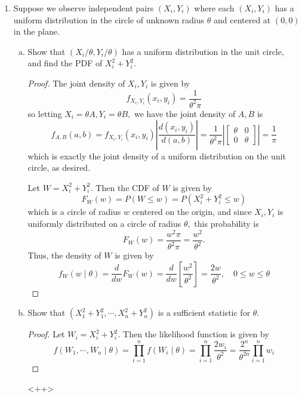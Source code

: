\documentclass{article}
\begin{document}
\begin{enumerate}
\begin{enumerate}[(a)]
		\end{enumerate}

	\item Suppose we observe independent pairs $(X_i, Y_i)$ where each $(X_i, Y_i)$ has a uniform distribution in the circle of unknown radius $\theta$ and centered at $(0, 0)$ in the plane.

		\begin{enumerate}[(a)]
			\item Show that $(X_i/\theta, Y_i/\theta)$ has a uniform distribution in the unit circle, and find the PDF of $X_i^2+Y_i^2.$
				\begin{proof}
					The joint density of $X_i, Y_i$ is given by \[f_{X_i, Y_i}(x_i, y_i)=\frac{1}{\theta^2\pi}\] so letting $X_i=\theta A, Y_i=\theta B,$ we have the joint density of $A, B$ is \[f_{A, B}(a, b)=f_{X_i, Y_i}(x_i, y_i)\left\lvert \frac{d(x_i, y_i)}{d(a, b)} \right\rvert = \frac{1}{\theta^2\pi} \left\lvert \begin{bmatrix}
						\theta & 0 \\ 0 & \theta
				\end{bmatrix}\right\rvert = \frac{1}{\pi}\] which is exactly the joint density of a uniform distribution on the unit circle, as desired.

				Let $W=X_i^2+Y_i^2.$ Then the CDF of $W$ is given by \[F_W(w)=P(W\le w)=P(X_i^2+Y_i^2\le w)\] which is a circle of radius $w$ centered on the origin, and since $X_i, Y_i$ is uniformly distributed on a circle of radius $\theta,$ this probability is \[F_W(w)=\frac{w^2\pi}{\theta^2\pi}=\frac{w^2}{\theta^2}.\] Thus, the density of $W$ is given by \[f_W(w\mid\theta)=\frac{d}{dw}F_W(w)=\frac{d}{dw}\left[ \frac{w^2}{\theta^2} \right]=\frac{2w}{\theta^2}, \quad 0\le w\le \theta\]
				
				\end{proof}

			\item Show that $(X_1^2+Y_1^2, \cdots, X_n^2+Y_n^2)$ is a sufficient statistic for $\theta.$
				\begin{proof}
					Let $W_i=X_i^2+Y_i^2.$ Then the likelihood function is given by \[f(W_1, \cdots, W_n\mid \theta) = \prod_{i=1}^{n}f(W_i\mid\theta)=\prod_{i=1}^{n}\frac{2w_i}{\theta^2} = \frac{2^n}{\theta^{2n}}\prod_{i=1}^{n}w_i\]
				\end{proof}<++>


\end{enumerate}
\end{enumerate}
\end{document}
